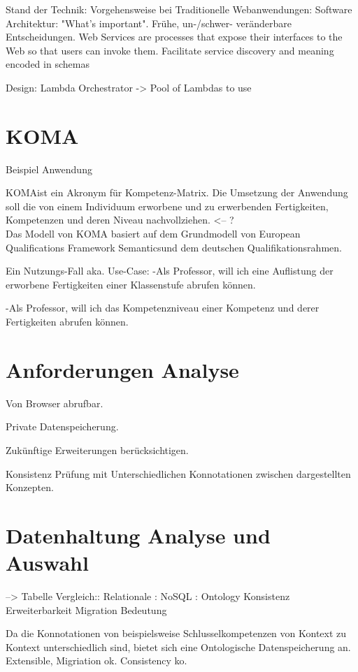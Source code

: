 \documentclass[
12pt,
english,
ngerman,
headsepline,
twoside,
openright,
numbers=noenddot,version=first
]{scrreprt}
\begin{document}
Stand der Technik: 
Vorgehensweise bei Traditionelle Webanwendungen:  
Software Architektur: "What's important". Frühe, un-/schwer- veränderbare Entscheidungen.
Web Services are processes that expose their interfaces to the Web so that users can invoke them. Facilitate service discovery and meaning encoded in schemas


Design: Lambda Orchestrator -> Pool of Lambdas to use

\section{KOMA}{Beispiel Anwendung}
\label{sec:KOMA}

\glqq KOMA\grqq ist ein Akronym für Kompetenz-Matrix. Die Umsetzung der Anwendung soll die von einem Individuum erworbene und zu erwerbenden Fertigkeiten, Kompetenzen und deren Niveau nachvollziehen. <-- ? \\

Das Modell von KOMA basiert auf dem Grundmodell von \glqq European Qualifications Framework Semantics\grqq und dem deutschen Qualifikationsrahmen. 

Ein Nutzungs-Fall aka. Use-Case: 
-Als Professor, will ich eine Auflistung der erworbene Fertigkeiten einer Klassenstufe abrufen können.

-Als Professor, will ich das Kompetenzniveau einer Kompetenz und derer Fertigkeiten abrufen können.

\section{Anforderungen Analyse}
Von Browser abrufbar. 

Private Datenspeicherung.

Zukünftige Erweiterungen berücksichtigen.

Konsistenz Prüfung mit Unterschiedlichen Konnotationen zwischen dargestellten Konzepten. 



\section{Datenhaltung Analyse und Auswahl}

--> Tabelle 
Vergleich:: Relationale : NoSQL : Ontology
Konsistenz
Erweiterbarkeit
Migration
Bedeutung


Da die Konnotationen von beispielsweise Schlusselkompetenzen von Kontext zu Kontext unterschiedlich sind,
bietet sich eine Ontologische Datenspeicherung an. Extensible, Migriation ok. Consistency ko.
\end{document}
